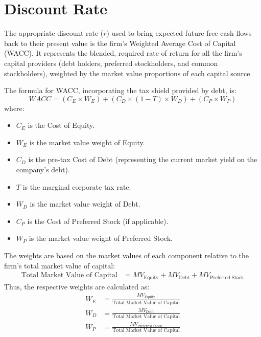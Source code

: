 \chapter{Discount Rate} \label{chap:discount_rate}

The appropriate discount rate (\(r\)) used to bring expected future free cash flows back to their present value is the firm's Weighted Average Cost of Capital (WACC). It represents the blended, required rate of return for all the firm's capital providers (debt holders, preferred stockholders, and common stockholders), weighted by the market value proportions of each capital source.

The formula for WACC, incorporating the tax shield provided by debt, is:
\begin{equation} \label{eq:wacc}
    WACC = (C_E \times W_E) + (C_D \times (1-T) \times W_D) + (C_P \times W_P)
\end{equation}
where:
\begin{itemize}
    \item \(C_E\) is the Cost of Equity.
    \item \(W_E\) is the market value weight of Equity.
    \item \(C_D\) is the pre-tax Cost of Debt (representing the current market yield on the company's debt).
    \item \(T\) is the marginal corporate tax rate.
    \item \(W_D\) is the market value weight of Debt.
    \item \(C_P\) is the Cost of Preferred Stock (if applicable).
    \item \(W_P\) is the market value weight of Preferred Stock.
\end{itemize}

The weights are based on the market values of each component relative to the firm's total market value of capital:
\begin{align*}
    \text{Total Market Value of Capital} & = MV_{\text{Equity}} + MV_{\text{Debt}} + MV_{\text{Preferred Stock}}
\end{align*}
Thus, the respective weights are calculated as:
\begin{align*}
    W_E & = \frac{MV_{\text{Equity}}}{\text{Total Market Value of Capital}}          \\[6pt]
    W_D & = \frac{MV_{\text{Debt}}}{\text{Total Market Value of Capital}}            \\[6pt]
    W_P & = \frac{MV_{\text{Preferred Stock}}}{\text{Total Market Value of Capital}}
\end{align*}

